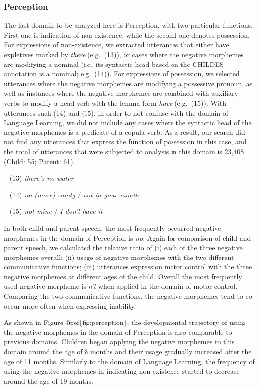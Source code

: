 \documentclass[10pt, letterpaper]{article}
\begin{document}
\hypertarget{perception}{%
\subsubsection{Perception}\label{perception}}

The last domain to be analyzed here is Perception, with two particular
functions. First one is indication of non-existence, while the second
one denotes possession. For expressions of non-existence, we extracted
utterances that either have expletives marked by \emph{there}
(e.g.~(13)), or cases where the negative morphemes are modifying a
nominal (i.e.~its syntactic head based on the CHILDES annotation is a
nominal; e.g.~(14)). For expressions of possession, we selected
utterances where the negative morphemes are modifying a possessive
pronoun, as well as instances where the negative morphemes are combined
with auxiliary verbs to modify a head verb with the lemma form
\emph{have} (e.g.~(15)). With utterances such (14) and (15), in order to
not confuse with the domain of Language Learning, we did not include any
cases where the syntactic head of the negative morphemes is a predicate
of a copula verb. As a result, our search did not find any utterances
that express the function of possession in this case, and the total of
utterances that were subjected to analysis in this domain is 23,408
(Child: 55; Parent: 61).

~ (13) \emph{there's no water}

~ (14) \emph{no (more) candy} / \emph{not in your mouth}

~ (15) \emph{not mine} / \emph{I don't have it}

In both child and parent speech, the most frequently occurred negative
morphemes in the domain of Perception is \emph{no}. Again for comparison
of child and parent speech, we calculated the relative ratio of (i) each
of the three negative morphemes overall; (ii) usage of negative
morphemes with the two different communicative functions; (iii)
utterances expression motor control with the three negative morphemes at
different ages of the child. Overall the most frequently used negative
morpheme is \emph{n't} when applied in the domain of motor control.
Comparing the two communicative functions, the negative morphemes tend
to co-occur more often when expressing inability.

As shown in Figure @ref\{fig:perception\}, the developmental trajectory
of using the negative morphemes in the domain of Perception is also
comparable to previous domains. Children began applying the negative
morphemes to this domain around the age of 8 months and their usage
gradually increased after the age of 11 months. Similarly to the domain
of Language Learning, the frequency of using the negative morphemes in
indicating non-existence started to decrease around the age of 19
months.
\end{document}
